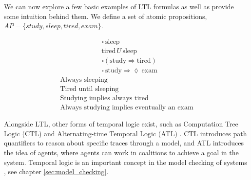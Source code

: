 \\ \\
We can now explore a few basic examples of LTL formulas as well as provide some intuition behind them. We define a set of atomic propositions, $AP = \{study, sleep, tired, exam\}$.
\begin{multicols}{2}
    \[
    \begin{aligned}
    &\square \ \text{sleep} \\
    &\text{tired} \, U \, \text{sleep} \\
    &\square (\text{study} \Rightarrow \text{tired}) \\
    &\square \ \text{study} \Rightarrow \lozenge \ \text{exam}
    \end{aligned}
    \]
    \vline
    \[
    \begin{aligned}
    \text{Always sleeping} \\
    \text{Tired until sleeping} \\
    \text{Studying implies always tired} \\
    \text{Always studying implies eventually an exam}
    \end{aligned}
    \]
    \end{multicols}
Alongside LTL, other forms of temporal logic exist, such as Computation Tree Logic (CTL) \cite{temporal_and_modal_logic} and Alternating-time Temporal Logic (ATL) \cite{atl}. CTL introduces path quantifiers to reason about specific traces through a model, and ATL introduces the idea of agents, where agents can work in coalitions to achieve a goal in the system. Temporal logic is an important concept in the model checking of systems \cite{principles_of_model_checking}, see chapter \ref{sec:model_checking}. 
